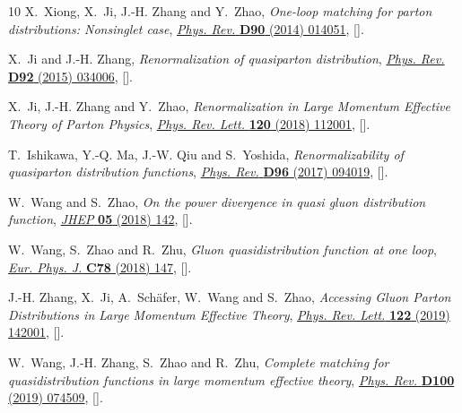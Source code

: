 \documentclass[12pt]{article}
\numberwithin{equation}{section}
\newcommand{\1}[1]{\mathbf{1}^{#1}}
\newcommand{\2}[1]{\mathbf{2}^{#1}}
\newcommand{\3}[1]{\mathbf{3}^{#1}}
\newcommand{\4}[1]{\mathbf{4}^{#1}}
\newcommand{\5}[1]{\mathbf{5}^{#1}}
\begin{document}
\begin{thebibliography}{10}
X.~Xiong, X.~Ji, J.-H. Zhang and Y.~Zhao, \emph{{One-loop matching for parton
  distributions: Nonsinglet case}},
  \href{http://dx.doi.org/10.1103/PhysRevD.90.014051}{\emph{Phys. Rev.}
  {\bfseries D90} (2014) 014051},
  [\href{https://arxiv.org/abs/1310.7471}{{}}].

X.~Ji and J.-H. Zhang, \emph{{Renormalization of quasiparton distribution}},
  \href{http://dx.doi.org/10.1103/PhysRevD.92.034006}{\emph{Phys. Rev.}
  {\bfseries D92} (2015) 034006},
  [\href{https://arxiv.org/abs/1505.07699}{{}}].

X.~Ji, J.-H. Zhang and Y.~Zhao, \emph{{Renormalization in Large Momentum
  Effective Theory of Parton Physics}},
  \href{http://dx.doi.org/10.1103/PhysRevLett.120.112001}{\emph{Phys. Rev.
  Lett.} {\bfseries 120} (2018) 112001},
  [\href{https://arxiv.org/abs/1706.08962}{{}}].

T.~Ishikawa, Y.-Q. Ma, J.-W. Qiu and S.~Yoshida, \emph{{Renormalizability of
  quasiparton distribution functions}},
  \href{http://dx.doi.org/10.1103/PhysRevD.96.094019}{\emph{Phys. Rev.}
  {\bfseries D96} (2017) 094019},
  [\href{https://arxiv.org/abs/1707.03107}{{}}].

W.~Wang and S.~Zhao, \emph{{On the power divergence in quasi gluon distribution
  function}}, \href{http://dx.doi.org/10.1007/JHEP05(2018)142}{\emph{JHEP}
  {\bfseries 05} (2018) 142},
  [\href{https://arxiv.org/abs/1712.09247}{{}}].

W.~Wang, S.~Zhao and R.~Zhu, \emph{{Gluon quasidistribution function at one
  loop}}, \href{http://dx.doi.org/10.1140/epjc/s10052-018-5617-3}{\emph{Eur.
  Phys. J.} {\bfseries C78} (2018) 147},
  [\href{https://arxiv.org/abs/1708.02458}{{}}].

J.-H. Zhang, X.~Ji, A.~Sch{\"a}fer, W.~Wang and S.~Zhao, \emph{{Accessing Gluon
  Parton Distributions in Large Momentum Effective Theory}},
  \href{http://dx.doi.org/10.1103/PhysRevLett.122.142001}{\emph{Phys. Rev.
  Lett.} {\bfseries 122} (2019) 142001},
  [\href{https://arxiv.org/abs/1808.10824}{{}}].

W.~Wang, J.-H. Zhang, S.~Zhao and R.~Zhu, \emph{{Complete matching for
  quasidistribution functions in large momentum effective theory}},
  \href{http://dx.doi.org/10.1103/PhysRevD.100.074509}{\emph{Phys. Rev.}
  {\bfseries D100} (2019) 074509},
  [\href{https://arxiv.org/abs/1904.00978}{{}}].


\end{thebibliography}
\end{document}
